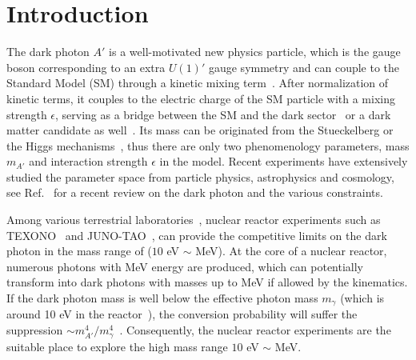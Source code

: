 \documentclass[prd,showpacs,preprintnumbers,amsmath,amssymb,twocolumn,superscriptaddress,notitlepage]{revtex4-2}
\begin{document}
\maketitle



\section{Introduction}


The dark photon $A'$ is a well-motivated new physics particle, which is the gauge boson corresponding to an extra $U(1)'$ gauge symmetry and can couple to the Standard Model (SM) through a kinetic mixing term~\cite{Fayet:1980ad, Fayet:1980rr, Okun:1982xi, Galison:1983pa, Holdom:1985ag, Fayet:1990wx, Foot:1991kb}. After normalization of kinetic terms, it couples to the electric charge of the SM particle with a mixing strength $\epsilon$, serving as a bridge between the SM and the dark sector~\cite{Pospelov:2007mp, Arkani-Hamed:2008hhe, Essig:2013lka, Alexander:2016aln, Battaglieri:2017aum} or a dark matter candidate as well~\cite{Redondo:2008ec, Nelson:2011sf, Arias:2012az, Graham:2015rva}. Its mass can be originated from the Stueckelberg or the Higgs mechanisms~\cite{Kors:2005uz, Feldman:2006ce, Feldman:2006wb, Feldman:2007wj, Feldman:2009wv, Du:2019mlc, Du:2021cmt, Redi:2022zkt}, thus there are only two phenomenology parameters, mass $m_{A'}$ and interaction strength $\epsilon$ in the model. Recent experiments have extensively studied the parameter space from particle physics, astrophysics and cosmology, see Ref.~\cite{Fabbrichesi:2020wbt, Caputo:2021eaa} for a recent review on the dark photon and the various constraints.


Among various terrestrial laboratories~\cite{Ilten:2018crw, Bauer:2018onh}, nuclear reactor experiments such as TEXONO~\cite{Danilov:2018bks} and JUNO-TAO~\cite{Smirnov:2021wgi}, can provide the competitive limits on the dark photon in the mass range of ($10$ eV $\sim$ MeV). At the core of a nuclear reactor, numerous photons with MeV energy are produced, which can potentially transform into dark photons with masses up to MeV if allowed by the kinematics. 
If the dark photon mass is well below the effective photon mass $m_\gamma$ (which is around 10 eV in the reactor~\cite{Danilov:2018bks}), the conversion probability will suffer the suppression $\sim m_{A'}^4/m_\gamma^4$~\cite{Mizumoto:2013jy, Fortin:2019npr}. Consequently, the nuclear reactor experiments are 
the suitable place to explore the high mass range $10$ eV $\sim$ MeV.
\end{document}
